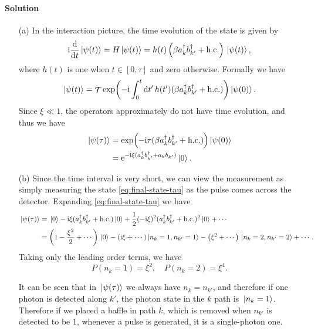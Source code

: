 \documentclass[hyperref, a4paper]{article}
\DeclareMathOperator{\timeorder}{\mathcal{T}}
\newcommand*{\ii}{\mathrm{i}}
\newcommand*{\ee}{\mathrm{e}}
\begin{document}
\paragraph{Solution} \begin{itemize}
    \item[(a)] In the interaction picture, the time evolution of the state is given by
    \[
        \ii \dv{t} \ket*{\psi(t)} = H \ket*{\psi(t)} = h(t) \left( \beta a^\dagger_{k} b_{k'}^\dagger + \text{h.c.} \right) \ket*{\psi(t)},
    \] 
    where $h(t)$ is one when $t \in [0, \tau]$ and zero otherwise.
    Formally we have 
    \[
        \ket*{\psi(t)} = \timeorder \exp(- \ii \int_0^t \dd{t'} h(t') (\beta a^\dagger_k b^\dagger_{k'} + \text{h.c.})) \ket*{\psi(0)}.
    \]
    Since $\xi \ll 1$, the operators approximately do not have time evolution, and thus we have 
    \begin{equation}
        \begin{aligned}
            \ket*{\psi(\tau)} &= \exp(- \ii \tau (\beta a^\dagger_k b^\dagger_{k'} + \text{h.c.})) \ket*{\psi(0)} \\
            &= \ee^{- \ii \xi (a^\dagger_k b^\dagger_{k'} + a_k b_{k'})} \ket*{0} .
        \end{aligned}
        \label{eq:final-state-tau}
    \end{equation}
    \item[(b)] Since the time interval is very short, we can view the measurement as simply measuring the state \eqref{eq:final-state-tau} as the pulse comes across the detector.
    Expanding \eqref{eq:final-state-tau} we have 
    \[
        \begin{aligned}
            \ket*{\psi(\tau)} &= \ket*{0} - \ii \xi (a^\dagger_{k} b^\dagger_{k'} + \text{h.c.}) \ket*{0} + \frac{1}{2} (- \ii \xi)^2 (a^\dagger_{k} b^\dagger_{k'} + \text{h.c.})^2 \ket*{0} + \cdots \\
            &= \left( 1 - \frac{\xi^2}{2} + \cdots \right) \ket*{0} - (\ii \xi + \cdots) \ket*{n_k = 1, n_{k'} = 1} - \left( \xi^2 + \cdots \right) \ket*{n_k = 2, n_{k'} = 2} + \cdots.  
        \end{aligned}
    \] 
    Taking only the leading order terms, we have 
    \begin{equation}
        P(n_k = 1) = \xi^2, \quad P(n_k = 2) = \xi^4.
    \end{equation}

    It can be seen that in $\ket*{\psi(\tau)}$ we always have $n_k = n_{k'}$, and therefore if one photon is detected along $k'$, the photon state in the $k$ path is $\ket*{n_k = 1}$.
    Therefore if we placed a baffle in path $k$, which is removed when $n_{k'}$ is detected to be $1$, whenever a pulse is generated, it is a single-photon one.
\end{itemize}
\end{document}
